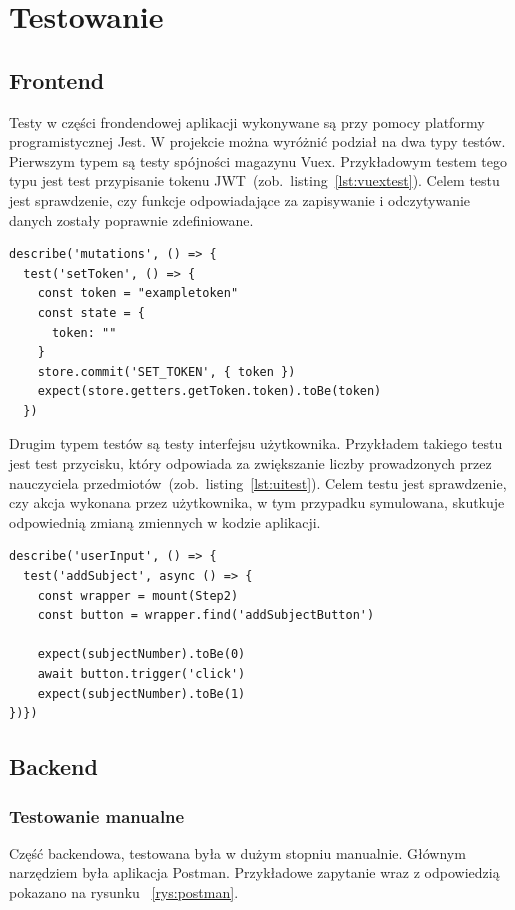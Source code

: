 
\chapter{Testowanie}
\section{Frontend}
Testy w części frondendowej aplikacji wykonywane są przy pomocy platformy programistycznej Jest. W projekcie można wyróżnić podział na dwa typy testów. Pierwszym typem są testy spójności magazynu Vuex. Przykładowym testem tego typu jest test przypisanie tokenu JWT~(zob.~listing~\ref{lst:vuextest}). Celem testu jest sprawdzenie, czy funkcje odpowiadające za zapisywanie i odczytywanie danych zostały poprawnie zdefiniowane.
\begin{lstlisting}[caption=Test spójności magazynu Vuex,label={lst:vuextest}] 
describe('mutations', () => {
  test('setToken', () => {
    const token = "exampletoken"
    const state = {
      token: ""
    }
    store.commit('SET_TOKEN', { token })
    expect(store.getters.getToken.token).toBe(token)
  })
\end{lstlisting}

Drugim typem testów są testy interfejsu użytkownika. Przykładem takiego testu jest test przycisku, który odpowiada za zwiększanie liczby prowadzonych przez nauczyciela przedmiotów~(zob.~listing~\ref{lst:uitest}). Celem testu jest sprawdzenie, czy akcja wykonana przez użytkownika, w tym przypadku symulowana, skutkuje odpowiednią zmianą zmiennych w kodzie aplikacji. 
\begin{lstlisting}[caption=Test interfejsu użytkownika,label={lst:uitest}] 
describe('userInput', () => {
  test('addSubject', async () => {
    const wrapper = mount(Step2)
    const button = wrapper.find('addSubjectButton')

    expect(subjectNumber).toBe(0)
    await button.trigger('click')
    expect(subjectNumber).toBe(1)
})})
\end{lstlisting}
\section{Backend}
\subsection{Testowanie manualne}

Część backendowa, testowana była w dużym stopniu manualnie. Głównym narzędziem była aplikacja Postman. Przykładowe zapytanie wraz z odpowiedzią pokazano na rysunku ~\ref{rys:postman}.

